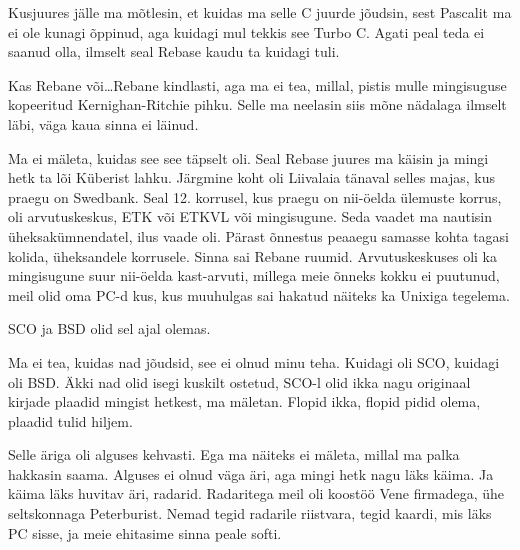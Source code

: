                  
Kusjuures jälle ma  mõtlesin, et kuidas ma selle C juurde 
jõudsin, sest Pascalit ma ei ole kunagi õppinud, aga kuidagi mul tekkis see 
Turbo C. Agati peal teda ei saanud olla, ilmselt seal Rebase kaudu ta kuidagi 
tuli. 

Kas Rebane või\ldots Rebane kindlasti, aga ma ei tea, millal, pistis mulle 
mingisuguse kopeeritud Kernighan-Ritchie pihku. Selle ma neelasin siis 
mõne nädalaga ilmselt läbi, väga kaua sinna ei läinud.  


Ma ei mäleta, kuidas see see täpselt oli. Seal Rebase juures ma käisin ja mingi 
hetk ta lõi  Küberist lahku. Järgmine koht oli Liivalaia tänaval selles majas, 
kus praegu on Swedbank.  Seal 12. korrusel, kus 
praegu on nii-öelda ülemuste korrus, oli arvutuskeskus, ETK või ETKVL või 
mingisugune. Seda vaadet ma nautisin üheksakümnendatel, ilus 
vaade oli. Pärast õnnestus peaaegu samasse kohta tagasi kolida, üheksandele 
korrusele. Sinna  sai Rebane ruumid. Arvutuskeskuses oli ka mingisugune suur 
nii-öelda kast-arvuti, millega meie õnneks kokku ei puutunud, meil olid  oma 
PC-d kus, kus muuhulgas sai hakatud näiteks ka Unixiga tegelema.


SCO ja BSD olid sel ajal olemas.


Ma ei tea, kuidas nad jõudsid, see ei olnud minu teha. Kuidagi oli SCO, kuidagi 
oli BSD. Äkki nad olid isegi kuskilt ostetud, SCO-l olid  ikka nagu originaal 
kirjade plaadid mingist hetkest, ma mäletan. Flopid ikka, flopid pidid olema, 
plaadid tulid hiljem. 


Selle äriga oli  alguses kehvasti. Ega ma näiteks ei mäleta, millal ma  palka 
hakkasin saama. Alguses ei olnud väga äri, aga mingi hetk nagu läks käima. Ja 
käima läks  huvitav äri, radarid. Radaritega meil oli koostöö Vene firmadega, 
ühe seltskonnaga Peterburist. Nemad tegid  radarile riistvara, tegid kaardi, 
mis läks PC sisse, ja meie ehitasime sinna peale softi.
           
